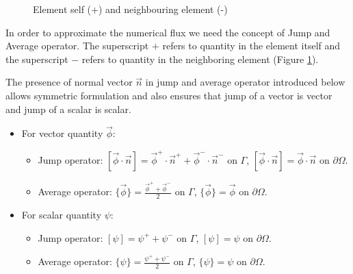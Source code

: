 \documentclass[graybox]{svmult}
\begin{document}
\begin{figure}
\caption{Element self (+) and neighbouring element (-)}
\label{fig:Self_neighbour}
\end{figure}
In order to approximate the numerical flux we need the concept of Jump and Average operator. The superscript $+$ refers to quantity in the element itself and the superscript $-$ refers to quantity in the neighboring element (Figure \ref{fig:Self_neighbour}).

The presence of normal vector $\overrightarrow{n}$ in jump and average operator introduced below allows symmetric formulation and also ensures that jump of a vector is vector and jump of a scalar is scalar.
\vspace{\baselineskip}
\vspace{\baselineskip}
\vspace{\baselineskip}
\begin{itemize}
\item For vector quantity $\overrightarrow{\phi}$:
\begin{itemize}
\item Jump operator: 
$\left[\overrightarrow{\phi} \cdot \overrightarrow{n}\right] = \overrightarrow{\phi}^+ \cdot \overrightarrow{n}^+ + \overrightarrow{\phi}^- \cdot \overrightarrow{n}^-$ on $\Gamma$, $\left[\overrightarrow{\phi} \cdot \overrightarrow{n}\right] = \overrightarrow{\phi} \cdot \overrightarrow{n}$ on $\partial \Omega$.
\item Average operator:
$\lbrace \overrightarrow{\phi} \rbrace = \frac{\overrightarrow{\phi}^+ + \overrightarrow{\phi}^-}{2}$ on $\Gamma$, $\lbrace \overrightarrow{\phi} \rbrace = \overrightarrow{\phi}$ on $\partial \Omega$.
\end{itemize}
\item For scalar quantity $\psi$:
\begin{itemize}
\item Jump operator:
$\left[\psi\right] = \psi^+ + \psi^-$ on $\Gamma$, $\left[\psi\right] = \psi$ on $\partial \Omega$.
\item Average operator:
$\lbrace \psi \rbrace = \frac{\psi^+ + \psi^-}{2}$ on $\Gamma$, $\lbrace \psi \rbrace = \psi$ on $\partial \Omega$. 
\end{itemize}
\end{itemize}
\end{document}
